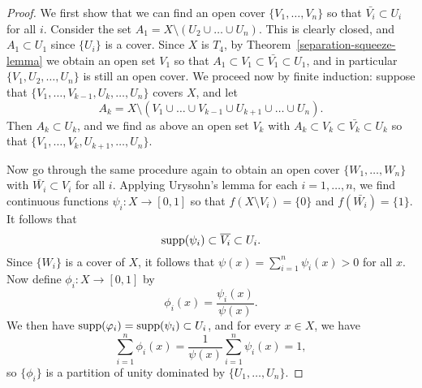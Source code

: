 \begin{proof}
  We first show that we can find an open cover $\{V_1, \dots, V_n\}$ so that $\bar{V_i} \subset U_i$ for all $i$. Consider the set $A_1 = X \setminus (U_2 \cup \dots \cup U_n)$. This is clearly closed, and $A_1 \subset U_1$ since $\{U_i\}$ is a cover. Since $X$ is $T_4$, by Theorem~\ref{separation-squeeze-lemma} we obtain an open set $V_1$ so that $A_1 \subset V_1 \subset \bar{V_1} \subset U_1$, and in particular $\{V_1,U_2,\dots,U_n\}$ is still an open cover. We proceed now by finite induction: suppose that $\{V_1, \dots, V_{k-1},U_k,\dots,U_n\}$ covers $X$, and let
  \[
    A_k = X \setminus (V_1 \cup \dots \cup V_{k-1} \cup U_{k+1} \cup \dots \cup U_n).
  \]
  Then $A_k \subset U_k$, and we find as above an open set $V_k$ with $A_k \subset V_k \subset \bar{V_k} \subset U_k$ so that $\{V_1, \dots, V_k, U_{k+1}, \dots, U_n\}$.
  
  Now go through the same procedure again to obtain an open cover $\{W_1, \dots, W_n\}$ with $\bar{W_i} \subset V_i$ for all $i$. Applying Urysohn's lemma for each $i = 1, \dots, n$, we find continuous functions $\psi_i : X \to [0,1]$ so that $f(X \setminus V_i) = \{0\}$ and $f(\bar{W_i}) = \{1\}$. It follows that
  \[
    \operatorname{supp}(\psi_i) \subset \overline{V_i} \subset U_i.
  \]
  Since $\{W_i\}$ is a cover of $X$, it follows that $\psi(x) = \sum_{i=1}^n \psi_i(x) > 0$ for all $x$. Now define $\phi_i : X \to [0,1]$ by
  \[
    \phi_i(x) = \frac{\psi_i(x)}{\psi(x)}.
  \]
  We then have $\operatorname{supp}(\varphi_i) = \operatorname{supp}(\psi_i) \subset U_i$, and for every $x \in X$, we have
  \[
    \sum_{i=1}^n \phi_i(x) = \frac{1}{\psi(x)} \sum_{i=1}^n \psi_i(x) = 1,
  \]
  so $\{\phi_i\}$ is a partition of unity dominated by $\{U_1,\dots,U_n\}$.
\end{proof}
